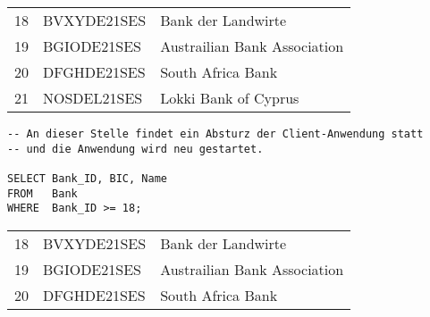 \clearpage
\begin{center}
    \begin{small}
        \tablehead{}
        \begin{msoraclesql}
            \begin{supertabular}{rll}
                18 & BVXYDE21SES & Bank der Landwirte \\
                19 & BGIODE21SES & Austrailian Bank Association \\
                20 & DFGHDE21SES & South Africa Bank \\
                21 & NOSDEL21SES & Lokki Bank of Cyprus  \\
            \end{supertabular}
        \end{msoraclesql}
    \end{small}
\end{center}
\begin{lstlisting}[language=oracle_sql,label=sql07_25]
-- An dieser Stelle findet ein Absturz der Client-Anwendung statt
-- und die Anwendung wird neu gestartet.

SELECT Bank_ID, BIC, Name
FROM   Bank
WHERE  Bank_ID >= 18;
          \end{lstlisting}
\begin{center}
    \begin{small}
        \tablehead{}
        \begin{msoraclesql}
            \begin{supertabular}{rll}
                18 & BVXYDE21SES & Bank der Landwirte \\
                19 & BGIODE21SES & Austrailian Bank Association \\
                20 & DFGHDE21SES & South Africa Bank \\
            \end{supertabular}
        \end{msoraclesql}
    \end{small}
\end{center}
